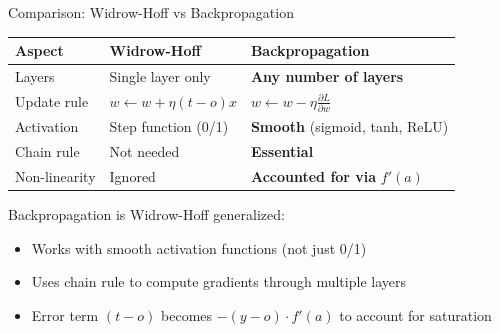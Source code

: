 \documentclass[aspectratio=169]{beamer}\usepackage[]{graphicx}\usepackage[]{xcolor}
\begin{document}
\begin{frame}{Comparison: Widrow-Hoff vs Backpropagation}

\begin{center}
\small
\begin{tabular}{lll}
\toprule
\textbf{Aspect} & \textbf{Widrow-Hoff} & \textbf{Backpropagation} \\
\midrule
Layers & Single layer only & \textbf{Any number of layers} \\
\midrule
Update rule & $w \leftarrow w + \eta(t-o)x$ & $w \leftarrow w - \eta \frac{\partial L}{\partial w}$ \\
\midrule
Activation & Step function (0/1) & \textbf{Smooth} (sigmoid, tanh, ReLU) \\
\midrule
Chain rule & Not needed & \textbf{Essential} \\
\midrule
Non-linearity & Ignored & \textbf{Accounted for via } $f'(a)$ \\
\bottomrule
\end{tabular}
\end{center}

\vfill

Backpropagation is Widrow-Hoff generalized:
\begin{itemize}
    \item Works with smooth activation functions (not just 0/1)
    \item Uses chain rule to compute gradients through multiple layers
    \item Error term $(t-o)$ becomes $-(y-o) \cdot f'(a)$ to account for saturation
\end{itemize}

\end{frame}
\end{document}
